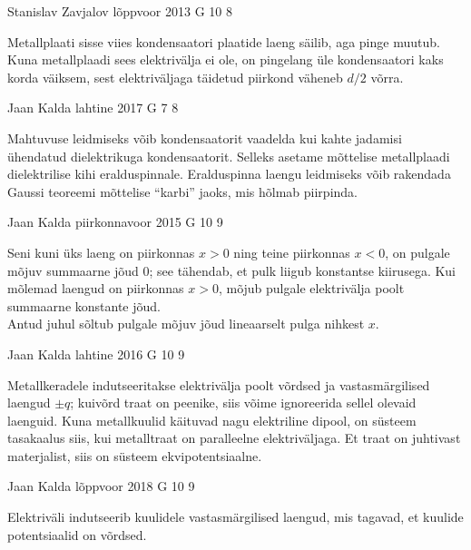 \documentclass[11pt]{article}
\begin{document}
{%
{Stanislav Zavjalov} %
{lõppvoor} %
{2013} %
{G 10} %
{8} %
{

\ifHint
Metallplaati sisse viies kondensaatori plaatide laeng säilib, aga pinge muutub. Kuna metallplaadi sees elektrivälja ei ole, on pingelang üle kondensaatori kaks korda väiksem, sest elektriväljaga täidetud piirkond väheneb $d/2$ võrra.
\fi
}

{Jaan Kalda} %
{lahtine} %
{2017} %
{G 7} %
{8} %
{

\ifHint
Mahtuvuse leidmiseks võib kondensaatorit vaadelda kui kahte jadamisi ühendatud dielektrikuga kondensaatorit. Selleks asetame mõttelise metallplaadi dielektrilise kihi eralduspinnale. Eralduspinna laengu leidmiseks võib rakendada Gaussi teoreemi mõttelise \enquote{karbi} jaoks, mis hõlmab piirpinda.
\fi
}

{Jaan Kalda} %
{piirkonnavoor} %
{2015} %
{G 10} %
{9} %
{

\ifHint
\osa Seni kuni üks laeng on piirkonnas $x>0$ ning teine piirkonnas $x<0$, on pulgale mõjuv summaarne jõud \num{0}; see tähendab, et pulk liigub konstantse kiirusega. Kui mõlemad laengud on piirkonnas $x>0$, mõjub pulgale elektrivälja poolt summaarne konstante jõud.\\
\osa Antud juhul sõltub pulgale mõjuv jõud lineaarselt pulga nihkest $x$.
\fi
}

{Jaan Kalda} %
{lahtine} %
{2016} %
{G 10} %
{9} %
{

\ifHint
Metallkeradele indutseeritakse elektrivälja poolt võrdsed ja vastasmärgilised laengud $\pm q$; kuivõrd traat on peenike,
siis võime ignoreerida sellel olevaid laenguid. Kuna metallkuulid käituvad nagu elektriline dipool, on süsteem tasakaalus siis, kui metalltraat on paralleelne elektriväljaga. Et traat on juhtivast materjalist, siis on süsteem ekvipotentsiaalne.
\fi
}

{Jaan Kalda} %
{lõppvoor} %
{2018} %
{G 10} %
{9} %
{

\ifHint
Elektriväli indutseerib kuulidele vastasmärgilised laengud, mis tagavad, et kuulide potentsiaalid on võrdsed.
\fi
}

}
\end{document}
